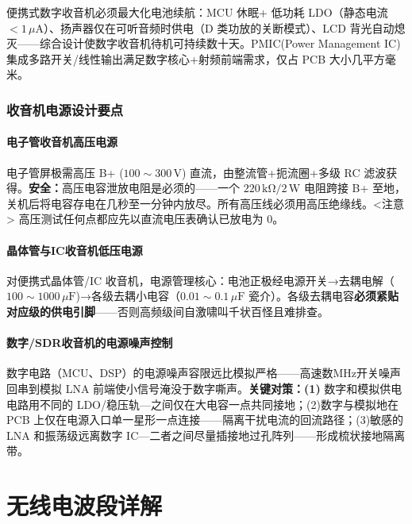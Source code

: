 \documentclass[12pt,UTF8]{ctexbook}
\begin{document}
便携式数字收音机必须最大化电池续航：MCU 休眠+ 低功耗 LDO（静态电流 $<1\,\mu\mathrm{A}$）、扬声器仅在可听音频时供电（D 类功放的关断模式）、LCD 背光自动熄灭——综合设计使数字收音机待机可持续数十天。PMIC(Power Management IC)集成多路开关/线性输出满足数字核心+射频前端需求，仅占 PCB 大小几平方毫米。

\section{收音机电源设计要点}
\label{sec:radio_power_design}

\subsection{电子管收音机高压电源}

电子管屏极需高压 B+ ($100\sim300\,\mathrm{V}$) 直流，由整流管+扼流圈+多级 RC 滤波获得。\textbf{安全：}高压电容泄放电阻是必须的——一个 $220\,\mathrm{k\Omega}/2\,\mathrm{W}$ 电阻跨接 B+ 至地，关机后将电容存电在几秒至一分钟内放尽。所有高压线必须用高压绝缘线。<注意> 高压测试任何点都应先以直流电压表确认已放电为 0。

\subsection{晶体管与IC收音机低压电源}

对便携式晶体管/IC 收音机，电源管理核心：电池正极经电源开关→去耦电解（$100\sim1000\,\mu\mathrm{F}$)→各级去耦小电容（$0.01\sim0.1\,\mu\mathrm{F}$ 瓷介）。各级去耦电容\textbf{必须紧贴对应级的供电引脚}——否则高频级间自激啸叫千状百怪且难排查。

\subsection{数字/SDR收音机的电源噪声控制}

数字电路（MCU、DSP）的电源噪声容限远比模拟严格——高速数MHz开关噪声回串到模拟 LNA 前端使小信号淹没于数字嘶声。\textbf{关键对策：(1)} 数字和模拟供电电路用不同的 LDO/稳压轨—之间仅在大电容一点共同接地；(2)数字与模拟地在 PCB 上仅在电源入口单一星形一点连接——隔离干扰电流的回流路径；(3)敏感的 LNA 和振荡级远离数字 IC—二者之间尽量插接地过孔阵列——形成梳状接地隔离带。


\part{无线电波段详解}
\end{document}
